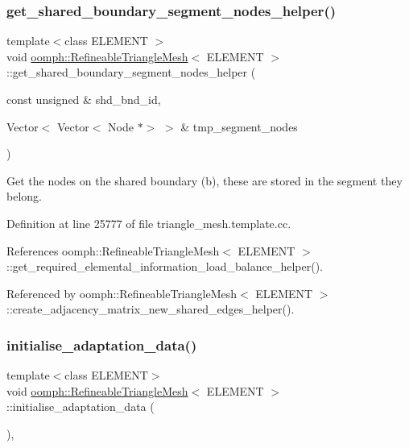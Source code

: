 \subsubsection{\texorpdfstring{get\+\_\+shared\+\_\+boundary\+\_\+segment\+\_\+nodes\+\_\+helper()}{get\_shared\_boundary\_segment\_nodes\_helper()}}
{\footnotesize\ttfamily template$<$class E\+L\+E\+M\+E\+NT $>$ \\
void \hyperlink{classoomph_1_1RefineableTriangleMesh}{oomph\+::\+Refineable\+Triangle\+Mesh}$<$ E\+L\+E\+M\+E\+NT $>$\+::get\+\_\+shared\+\_\+boundary\+\_\+segment\+\_\+nodes\+\_\+helper (\begin{DoxyParamCaption}\item[{const unsigned \&}]{shd\+\_\+bnd\+\_\+id,  }\item[{Vector$<$ Vector$<$ Node $\ast$$>$ $>$ \&}]{tmp\+\_\+segment\+\_\+nodes }\end{DoxyParamCaption})}



Get the nodes on the shared boundary (b), these are stored in the segment they belong. 



Definition at line 25777 of file triangle\+\_\+mesh.\+template.\+cc.



References oomph\+::\+Refineable\+Triangle\+Mesh$<$ E\+L\+E\+M\+E\+N\+T $>$\+::get\+\_\+required\+\_\+elemental\+\_\+information\+\_\+load\+\_\+balance\+\_\+helper().



Referenced by oomph\+::\+Refineable\+Triangle\+Mesh$<$ E\+L\+E\+M\+E\+N\+T $>$\+::create\+\_\+adjacency\+\_\+matrix\+\_\+new\+\_\+shared\+\_\+edges\+\_\+helper().

\mbox{\label{classoomph_1_1RefineableTriangleMesh_a1d3d0ec0b197741f6289e24de549f737}} 
\subsubsection{\texorpdfstring{initialise\+\_\+adaptation\+\_\+data()}{initialise\_adaptation\_data()}}
{\footnotesize\ttfamily template$<$class E\+L\+E\+M\+E\+NT$>$ \\
void \hyperlink{classoomph_1_1RefineableTriangleMesh}{oomph\+::\+Refineable\+Triangle\+Mesh}$<$ E\+L\+E\+M\+E\+NT $>$\+::initialise\+\_\+adaptation\+\_\+data (\begin{DoxyParamCaption}{ }\end{DoxyParamCaption})\hspace{0.3cm}{\ttfamily [inline]}, {\ttfamily [protected]}}



